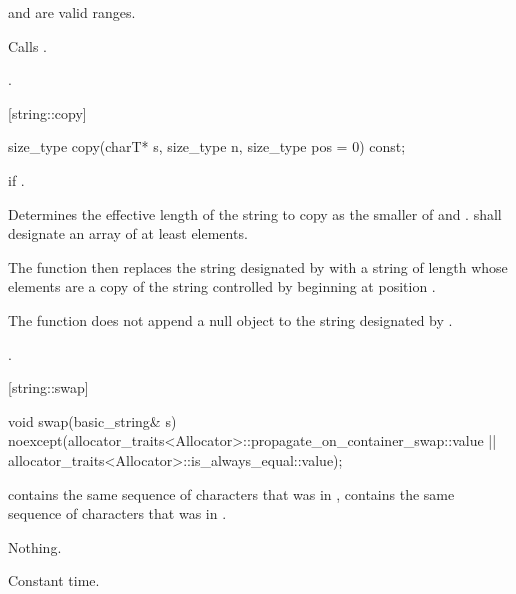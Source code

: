 \begin{itemdescr}
\pnum
\requires {} and  are valid ranges.

\pnum
\effects Calls .

\pnum
\returns
{}.
\end{itemdescr}


[string::copy]{}

%
%
\begin{itemdecl}
size_type copy(charT* s, size_type n, size_type pos = 0) const;
\end{itemdecl}

\begin{itemdescr}
\pnum
\requires
{}

\pnum
\throws
{}
if
.

\pnum
\effects
Determines the effective length 
of the string to copy as the smaller of  and
.
 shall designate an array of at least  elements.

The function then replaces the string designated by 
with a string of length  whose elements are a copy of the
string controlled by
beginning at position .

The function does not append a null object to the string designated
by .

\pnum
\returns
{}.
\end{itemdescr}

[string::swap]{}

%
%
\begin{itemdecl}
void swap(basic_string& s)
  noexcept(allocator_traits<Allocator>::propagate_on_container_swap::value ||
           allocator_traits<Allocator>::is_always_equal::value);
\end{itemdecl}

\begin{itemdescr}
\pnum
\postcondition
{}
contains the same sequence of characters that was in ,
 contains the same sequence of characters that was in
.

\pnum
\throws Nothing.

\pnum
\complexity Constant time.
\end{itemdescr}

